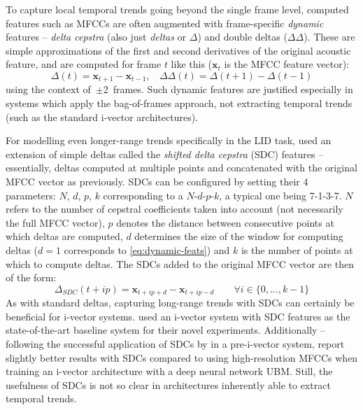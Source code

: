 \documentclass[bsc,frontabs,twoside,singlespacing,parskip,deptreport]{infthesis}
\begin{document}
{{{      %
      To capture local temporal trends going beyond the single frame level, computed features such as MFCCs are often augmented with frame-specific \textit{dynamic} features -- \textit{delta cepstra} (also just \textit{deltas} or $\Delta$) and double deltas ($\Delta\Delta$). These are simple approximations of the first and second derivatives of the original acoustic feature, and are computed for frame $t$ like this ($\mathbf{x}_t$ is the MFCC feature vector):
      \begin{equation}
        \label{eq:dynamic-feats}
        \Delta(t) = \mathbf{x}_{t+1} - \mathbf{x}_{t-1},\ \ \ \ \Delta\Delta(t) = \Delta(t+1) - \Delta(t-1)
      \end{equation}
      using the context of~$\pm$2~frames. Such dynamic features are justified especially in systems which apply the bag-of-frames approach, not extracting temporal trends (such as the standard i-vector architectures).

      For modelling even longer-range trends specifically in the LID task, \citet{Torres-Carrasquillo_et_al_2002} used an extension of simple deltas called the \textit{shifted delta cepstra} (SDC) features -- essentially, deltas computed at multiple points and concatenated with the original MFCC vector as previously. SDCs can be configured by setting their 4 parameters: $N$, $d$, $p$, $k$ corresponding to a $N$-$d$-$p$-$k$, a typical one being 7-1-3-7. $N$ refers to the number of cepstral coefficients taken into account (not necessarily the full MFCC vector), $p$ denotes the distance between consecutive points at which deltas are computed, $d$ determines the size of the window for computing deltas ($d=1$ corresponds to \autoref{eq:dynamic-feats}) and $k$ is the number of points at which to compute deltas. The SDCs added to the original MFCC vector are then of the form:
      \begin{equation}
        \label{eq:sdc-feats}
        \Delta_{SDC}(t+ip) = \mathbf{x}_{t+ip+d} - \mathbf{x}_{t+ip-d} \quad\quad \forall i \in \{0, ..., k-1\}
      \end{equation}
      As with standard deltas, capturing long-range trends with SDCs can certainly be beneficial for i-vector systems. \cite{Ferrer_et_al_2016} used an i-vector system with SDC features as the state-of-the-art baseline system for their novel experiments. Additionally -- following the successful application of SDCs by \citeauthor{Torres-Carrasquillo_et_al_2002} in a pre-i-vector system, \cite{Sarma_et_al_2018} report slightly better results with SDCs compared to using high-resolution MFCCs when training an i-vector architecture with a deep neural network UBM. Still, the usefulness of SDCs is not so clear in architectures inherently able to extract temporal trends.

}}}
\end{document}
